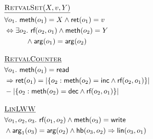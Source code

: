 \begin{align*}
  & \text{\underline{{\sc RetvalSet}$(X,v,Y)$}} \\
  & \forall o_1.\ {\sf meth}(o_1) = X\land {\sf ret}(o_1) = v \\
  & \Leftrightarrow \exists o_2.\ \textsf{rf}(o_2,o_1) \land {\sf meth}(o_2) = Y \\
  & \quad \quad \quad \land {\sf arg}(o_1)={\sf arg}(o_2)
  \\[1em]
  & \text{\underline{\sc RetvalCounter}} \\
  & \forall o_1.\ {\sf meth}(o_1) = {\sf read} \\
  & \Rightarrow {\sf ret}(o_1) = |\{o_2: {\sf meth}(o_2) = {\sf inc}\land \textsf{rf}(o_2,o_1)\}| \\
  & - |\{o_2: {\sf meth}(o_2) = {\sf dec}\land \textsf{rf}(o_2,o_1)\}|
  \\[1em]
  & \text{\underline{\sc LinLWW}} \\
  & \forall o_1, o_2, o_3.\ \textsf{rf}(o_1,o_2) \land {\sf meth}(o_3)={\sf write} \\
  & \land {\sf arg}_1(o_3)={\sf arg}(o_2)\land \textsf{hb}(o_3,o_2) \Rightarrow \mathsf{lin}(o_3,o_1)
\end{align*}
